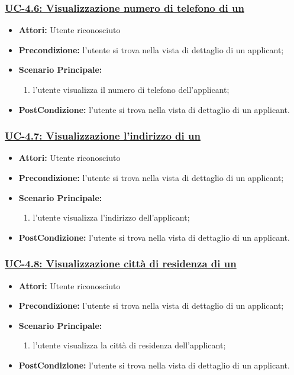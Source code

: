 \subsubsection{\underline{UC-4.6: Visualizzazione numero di telefono di un \applicant}}
\begin{itemize}
	\item \textbf{Attori:} Utente riconosciuto
	\item \textbf{Precondizione:} l'utente si trova nella vista di dettaglio di un applicant;
	\item \textbf{Scenario Principale:}
	\begin{enumerate} 
		\item l'utente visualizza il numero di telefono dell'applicant;
	\end{enumerate}
	\item \textbf{PostCondizione:} l'utente si trova nella vista di dettaglio di un applicant.
\end{itemize}

\subsubsection{\underline{UC-4.7: Visualizzazione l'indirizzo di un \applicant}}
\begin{itemize}
	\item \textbf{Attori:} Utente riconosciuto
	\item \textbf{Precondizione:} l'utente si trova nella vista di dettaglio di un applicant;
	\item \textbf{Scenario Principale:}
	\begin{enumerate} 
		\item l'utente visualizza l'indirizzo dell'applicant;
	\end{enumerate}
	\item \textbf{PostCondizione:} l'utente si trova nella vista di dettaglio di un applicant.
\end{itemize}

\subsubsection{\underline{UC-4.8: Visualizzazione città di residenza di un \applicant}}
\begin{itemize}
	\item \textbf{Attori:} Utente riconosciuto
	\item \textbf{Precondizione:} l'utente si trova nella vista di dettaglio di un applicant;
	\item \textbf{Scenario Principale:}
	\begin{enumerate} 
		\item l'utente visualizza la città di residenza dell'applicant;
	\end{enumerate}
	\item \textbf{PostCondizione:} l'utente si trova nella vista di dettaglio di un applicant.
\end{itemize}

